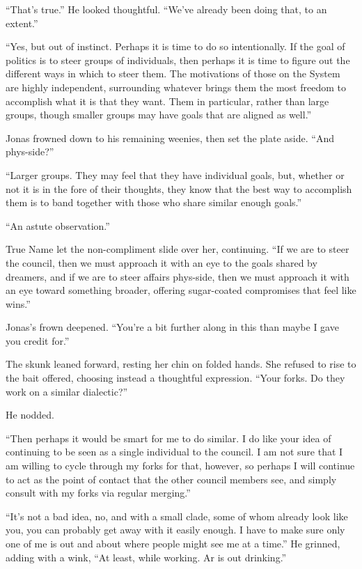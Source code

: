 ``That's true.'' He looked thoughtful. ``We've already been doing that, to an extent.''

``Yes, but out of instinct. Perhaps it is time to do so intentionally. If the goal of politics is to steer groups of individuals, then perhaps it is time to figure out the different ways in which to steer them. The motivations of those on the System are highly independent, surrounding whatever brings them the most freedom to accomplish what it is that they want. Them in particular, rather than large groups, though smaller groups may have goals that are aligned as well.''

Jonas frowned down to his remaining weenies, then set the plate aside. ``And phys-side?''

``Larger groups. They may feel that they have individual goals, but, whether or not it is in the fore of their thoughts, they know that the best way to accomplish them is to band together with those who share similar enough goals.''

``An astute observation.''

True Name let the non-compliment slide over her, continuing. ``If we are to steer the council, then we must approach it with an eye to the goals shared by dreamers, and if we are to steer affairs phys-side, then we must approach it with an eye toward something broader, offering sugar-coated compromises that feel like wins.''

Jonas's frown deepened. ``You're a bit further along in this than maybe I gave you credit for.''

The skunk leaned forward, resting her chin on folded hands. She refused to rise to the bait offered, choosing instead a thoughtful expression. ``Your forks. Do they work on a similar dialectic?''

He nodded.

``Then perhaps it would be smart for me to do similar. I do like your idea of continuing to be seen as a single individual to the council. I am not sure that I am willing to cycle through my forks for that, however, so perhaps I will continue to act as the point of contact that the other council members see, and simply consult with my forks via regular merging.''

``It's not a bad idea, no, and with a small clade, some of whom already look like you, you can probably get away with it easily enough. I have to make sure only one of me is out and about where people might see me at a time.'' He grinned, adding with a wink, ``At least, while working. Ar is out drinking.''

